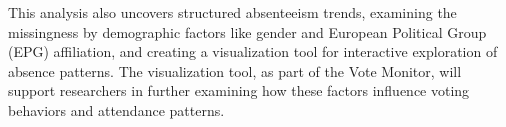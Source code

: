 \documentclass[a4paper,12pt]{report}
\begin{document}
        This analysis also uncovers structured absenteeism trends, examining the missingness by demographic factors
        like gender and European Political Group (EPG) affiliation, and creating a visualization tool for interactive
        exploration of absence patterns.  The visualization tool, as part of the
        Vote Monitor, will support researchers in further examining how these factors influence voting behaviors and
        attendance patterns.



\end{document}
